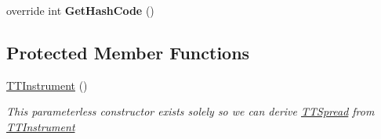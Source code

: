 \begin{DoxyCompactItemize}
\item 
\hypertarget{class_e_z_a_p_i_1_1_containers_1_1_t_t_instrument_a88865f2b8c50563a113160dd436e62a3}{override int {\bfseries Get\-Hash\-Code} ()}\label{class_e_z_a_p_i_1_1_containers_1_1_t_t_instrument_a88865f2b8c50563a113160dd436e62a3}

\end{DoxyCompactItemize}
\subsection*{Protected Member Functions}
\begin{DoxyCompactItemize}
\item 
\hyperlink{class_e_z_a_p_i_1_1_containers_1_1_t_t_instrument_a04065b5a5c9d09c81424192f5a44cd0a}{T\-T\-Instrument} ()
\begin{DoxyCompactList}\small\item\em This parameterless constructor exists solely so we can derive \hyperlink{class_e_z_a_p_i_1_1_containers_1_1_t_t_spread}{T\-T\-Spread} from \hyperlink{class_e_z_a_p_i_1_1_containers_1_1_t_t_instrument}{T\-T\-Instrument} \end{DoxyCompactList}\end{DoxyCompactItemize}
